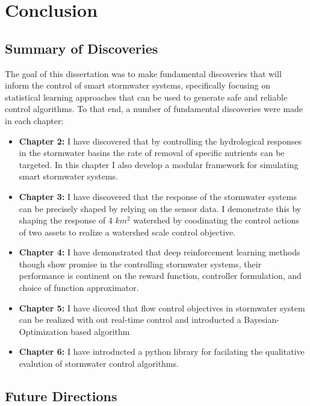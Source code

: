 \chapter{Conclusion}\label{ch:conclusion}
\section{Summary of Discoveries}

The goal of this dissertation was to make fundamental discoveries that will inform the control of smart stormwater systems, specifically focusing on statistical learning approaches that can be used to generate safe and reliable control algorithms.
To that end, a number of fundamental discoveries were made in each chapter: 

\begin{itemize}
	\item \textbf{Chapter 2:} I have discovered that by controlling the hydrological responses in the stormwater basins the rate of removal of specific nutrients can be targeted. In this chapter I also develop a modular framework for simulating smart stormwater systems.
	\item \textbf{Chapter 3:} I have discovered that the response of the stormwater systems can be precisely shaped by relying on the sensor data. I demonstrate this by shaping the response of 4 $km^2$ watershed by coodinating the control actions of two assets to realize a watershed scale control objective.
	\item \textbf{Chapter 4:} I have demonstrated that deep reinforcement learning methods though show promise in the controlling stormwater systems, their performance is continent on the reward function, controller formulation, and choice of function approximator.
	\item \textbf{Chapter 5:} I have dicoved that flow control objectives in stormwater system can be realized with out real-time control and introducted a Bayesian-Optimization based algorithm 
	\item \textbf{Chapter 6:} I have introducted a python library for facilating the qualitative evalution of stormwater control algorithms. 
\end{itemize}

\section{Future Directions}


